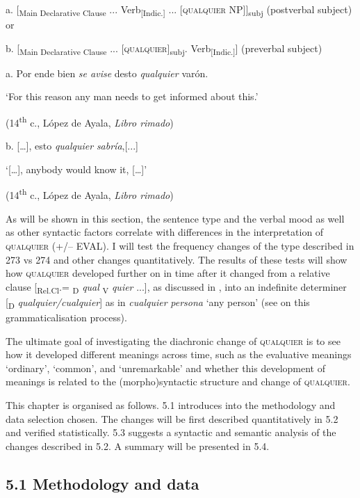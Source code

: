 \documentclass[output=paper]{langscibook}
\begin{document}
  a.  [\textsubscript{Main Declarative Clause} ... Verb\textsubscript{[Indic.]} ... [\textsc{qualquier} NP]]\textsubscript{subj}    (postverbal subject) or

  b.  [\textsubscript{Main Declarative Clause} ... [\textsc{qualquier}]\textsubscript{subj}. Verb\textsubscript{[Indic.]}]  (preverbal subject)

  a.  Por ende bien \textit{se avise} desto \textit{qualquier} varón. 

    ‘For this reason any man needs to get informed about this.’

    (14\textsuperscript{th} c., López de Ayala, \textit{Libro rimado})

  b.  […], esto \textit{qualquier} \textit{sabría},[...]

‘[…], anybody would know it, […]’

    (14\textsuperscript{th} c., López de Ayala, \textit{Libro rimado})

As will be shown in this section, the sentence type and the verbal mood as well as other syntactic factors correlate with differences in the interpretation of \textsc{qualquier} (+/– EVAL). I will test the frequency changes of the type described in 273 vs 274 and other changes quantitatively. The results of these tests will show how \textsc{qualquier} developed further on in time after it changed from a relative clause [\textsubscript{Rel.Cl}.= \textsubscript{D} \textit{qual} \textsubscript{V} \textit{quier} ...], as discussed in , into an indefinite determiner [\textsubscript{D} \textit{qualquier/cualquier}] as in \textit{cualquier} \textit{persona} ‘any person’ (see  on this grammaticalisation process).

  The ultimate goal of investigating the diachronic change of \textsc{qualquier} is to see how it developed different meanings across time, such as the evaluative meanings ‘ordinary’, ‘common’, and ‘unremarkable’ and whether this development of meanings is related to the (morpho)syntactic structure and change of \textsc{qualquier.} 

  This chapter is organised as follows. 5.1 introduces into the methodology and data selection chosen. The changes will be first described quantitatively in 5.2 and verified statistically. 5.3 suggests a syntactic and semantic analysis of the changes described in 5.2. A summary will be presented in 5.4.

\subsection{\textbf{5.1} \textbf{Methodology} \textbf{and} \textbf{data}}
\end{document}
